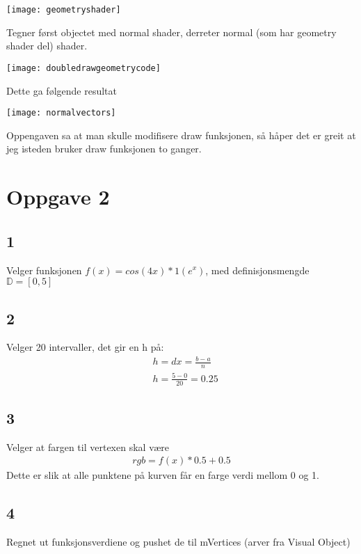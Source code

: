 ﻿\documentclass[14]{article}
\begin{document}
\begin{flushleft}
        \texttt{[image: geometryshader]}
        
        Tegner først objectet med normal shader, derreter normal (som har geometry shader del) shader.
        
        \texttt{[image: doubledrawgeometrycode]}
        
        Dette ga følgende resultat
        
        \texttt{[image: normalvectors]}
        
        Oppengaven sa at man skulle modifisere draw funksjonen, så håper det er greit at jeg isteden bruker draw funksjonen to ganger.
        
        \section{Oppgave 2}
            \subsection*{1}
        Velger funksjonen \(f(x)=cos(4x) * 1(e^x)\), med definisjonsmengde \(\mathbb{D} = [0,5]\)
        
            \subsection*{2}
        Velger 20 intervaller, det gir en h på: 
        \begin{align*}
            & h = dx = \frac{b-a}{n}\\
            & h = \frac{5-0}{20} = 0.25
        \end{align*}
        
        \subsection*{3}
        Velger at fargen til vertexen skal være 
        \begin{align*}
            rgb = f(x)*0.5 + 0.5
        \end{align*}
        Dette er slik at alle punktene på kurven får en farge verdi mellom 0 og 1.
        
        \subsection*{4}
        Regnet ut funksjonsverdiene og pushet de til mVertices (arver fra Visual Object)   
        

\end{flushleft}
\end{document}
